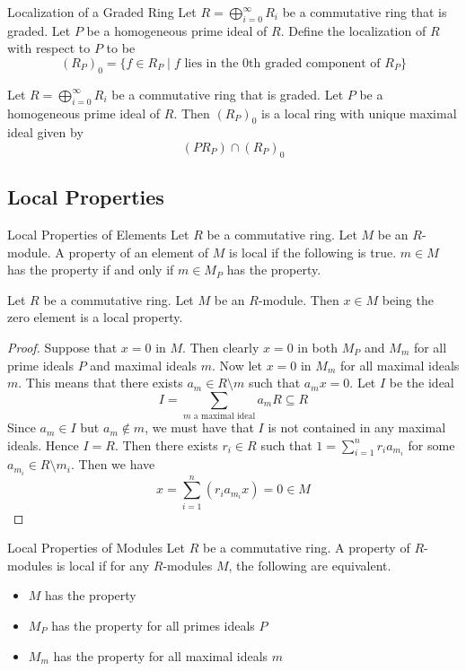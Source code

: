 \documentclass[a4paper]{article}
\begin{document}
\begin{defn}{Localization of a Graded Ring}{} Let $R=\bigoplus_{i=0}^\infty R_i$ be a commutative ring that is graded. Let $P$ be a homogeneous prime ideal of $R$. Define the localization of $R$ with respect to $P$ to be $$(R_P)_0=\{f\in R_P\;|\;f\text{ lies in the }0\text{th graded component of }R_P\}$$
\end{defn}

\begin{prp}{}{} Let $R=\bigoplus_{i=0}^\infty R_i$ be a commutative ring that is graded. Let $P$ be a homogeneous prime ideal of $R$. Then $(R_P)_0$ is a local ring with unique maximal ideal given by $$(PR_P)\cap(R_P)_0$$
\end{prp}

\subsection{Local Properties}
\begin{defn}{Local Properties of Elements}{} Let $R$ be a commutative ring. Let $M$ be an $R$-module. A property of an element of $M$ is local if the following is true. $m\in M$ has the property if and only if $m\in M_P$ has the property. 
\end{defn}

\begin{lmm}{}{} Let $R$ be a commutative ring. Let $M$ be an $R$-module. Then $x\in M$ being the zero element is a local property. 
\begin{proof}
Suppose that $x=0$ in $M$. Then clearly $x=0$ in both $M_P$ and $M_m$ for all prime ideals $P$ and maximal ideals $m$. Now let $x=0$ in $M_m$ for all maximal ideals $m$. This means that there exists $a_m\in R\setminus m$ such that $a_mx=0$. Let $I$ be the ideal $$I=\sum_{m\text{ a maximal ideal}}a_mR\subseteq R$$ Since $a_m\in I$ but $a_m\notin m$, we must have that $I$ is not contained in any maximal ideals. Hence $I=R$. Then there exists $r_i\in R$ such that $1=\sum_{i=1}^nr_ia_{m_i}$ for some $a_{m_i}\in R\setminus m_i$. Then we have $$x=\sum_{i=1}^n(r_ia_{m_i}x)=0\in M$$
\end{proof}
\end{lmm}

\begin{defn}{Local Properties of Modules}{} Let $R$ be a commutative ring. A property of $R$-modules is local if for any $R$-modules $M$, the following are equivalent. 
\begin{itemize}
\item $M$ has the property
\item $M_P$ has the property for all primes ideals $P$
\item $M_m$ has the property for all maximal ideals $m$
\end{itemize}
\end{defn}
\end{document}
